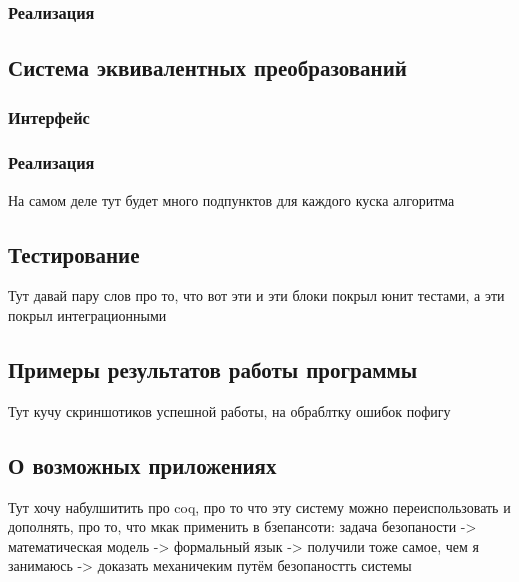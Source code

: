 \subsubsection{Реализация}


\subsection{Система эквивалентных преобразований}

\subsubsection{Интерфейс}

\subsubsection{Реализация}
На самом деле тут будет много подпунктов для каждого куска алгоритма

\subsection{Тестирование}
Тут давай пару слов про то, что вот эти и эти блоки покрыл юнит тестами, а эти покрыл интеграционными

\subsection{Примеры результатов работы программы}
Тут кучу скриншотиков успешной работы, на обраблтку ошибок пофигу

\subsection{О возможных приложениях}
Тут хочу набулшитить про coq, про то что эту систему можно переиспользовать и дополнять, про то, что мкак применить в бзепансоти: задача безопаности -> математическая модель -> формальный язык -> получили тоже самое, чем я занимаюсь -> доказать механичеким путём безопаностть системы
